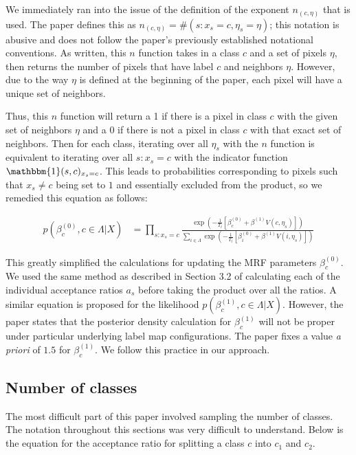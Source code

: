 \documentclass[11pt]{article}
\begin{document}
We immediately ran into the issue of the definition of the exponent $n_{(c, \eta)}$ that is used.
The paper defines this as $n_{(c, \eta)}=\#\left(s: x_{s}=c, \eta_{s}=\eta\right)$;
this notation is abusive and does not follow the paper's previously established notational conventions.
As written, this $n$ function takes in a class $c$ and a set of pixels $\eta$, then returns the number of pixels that have label $c$ and neighbors $\eta$. 
However, due to the way $\eta$ is defined at the beginning of the paper, each pixel will have a unique set of neighbors. 
 
Thus, this $n$ function will return a 1 if there is a pixel in class $c$ with the given set of neighbors $\eta$ and a $0$ if there is not a pixel in class $c$ with that exact set of neighbors. 
Then for each class, iterating over all $\eta_s$ with the $n$ function is equivalent to iterating over all $s: x_s = c$ with the indicator function $\mathbbm{1}(s,c)_{x_s = c}$.
This leads to probabilities corresponding to pixels such that $x_{s} \neq c$ being set to $1$ and essentially excluded from the product, so we remedied this equation as follows:

\begin{equation}
\begin{aligned}
p\left(\beta_{c}^{(0)}, c \in \Lambda | X\right) & = \prod_{s:x_{s} = c}\frac{\exp \left(-\frac{1}{T_{t}}\left[\beta_{c}^{(0)}+\beta^{(1)} V(c, \eta_{s})\right]\right)}{\sum_{i \in \Lambda} \exp \left(-\frac{1}{T_{t}}\left[\beta_{i}^{(0)}+\beta^{(1)} V(i, \eta_{s})\right]\right)}
\end{aligned}
\end{equation}

This greatly simplified the calculations for updating the MRF parameters  $\beta_{c}^{(0)}$.
We used the same method as described in Section 3.2 of calculating each of the individual acceptance ratios $a_{s}$ before taking the product over all the ratios.
A similar equation is proposed for the likelihood $p(\beta_{c}^{(1)}, c \in \Lambda | X)$. However, the paper states that the posterior density calculation for $\beta_{c}^{(1)}$ will not be proper under particular underlying label map configurations.
The paper fixes a value \textit{a priori} of $1.5$ for $\beta_{c}^{(1)}$.
We follow this practice in our approach.

\subsection{Number of classes}
The most difficult part of this paper involved sampling the number of classes.
The notation throughout this sections was very difficult to understand.
Below is the equation for the acceptance ratio for splitting a class $c$ into $c_{1}$ and $c_{2}$.
\end{document}

